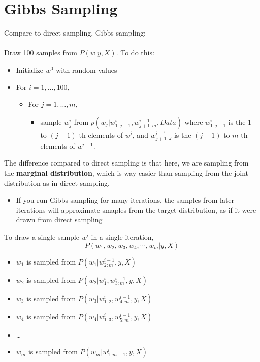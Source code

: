 \documentclass[10pt]{article}
\begin{document}
\section*{Gibbs Sampling}
Compare to direct sampling, Gibbs sampling:\\\\
Draw 100 samples from $P(w | y, X)$.  To do this:
\begin{itemize}
	\item Initialize $w^0$ with random values
	\item For $i = 1, \dots, 100$,
	\begin{itemize}
	    \item For $j = 1, \dots, m$,
	    \begin{itemize}
	        \item sample $w_j^i$ from $p(w_j | w_{1:j - 1}^i, w_{j + 1:m}^{i - 1}, Data)$
	        where $w_{1:j-1}^i$ is the $1$ to $(j-1)$-th elements of $w^i$, and $w_{j + 1:J}^{i - 1}$ is the $(j + 1)$ to $m$-th elements of $w^{i - 1}$.
        \end{itemize}
    \end{itemize}
\end{itemize}
The difference compared to direct sampling is that here, we are sampling from the \textbf{marginal distribution}, which is way easier than sampling from the joint distribution as in direct sampling.
\begin{itemize}
	\item If you run Gibbs sampling for many iterations, the samples from later iterations will approximate smaples from the target distribution, as if it were drawn from direct sampling
\end{itemize}
To draw a single sample $w^i$ in a single iteration,
\[P(w_1, w_2, w_3, w_4, \cdots, w_m | y, X)\]
\begin{itemize}
	\item $w_1$ is sampled from $P(w_1 | w_{2:m}^{i - 1}, y, X)$
	\item $w_2$ is sampled from $P(w_2 | w_1^i, w_{3:m}^{i - 1}, y, X)$
    \item $w_3$ is sampled from $P(w_3 | w_{1:2}^i, w_{4:m}^{i - 1}, y, X)$
    \item $w_4$ is sampled from $P(w_4 | w_{1:3}^i, w_{5:m}^{i - 1}, y, X)$
    \item \dots
    \item $w_m$ is sampled from $P(w_m | w_{1:m - 1}^i, y, X)$
\end{itemize}
\end{document}
